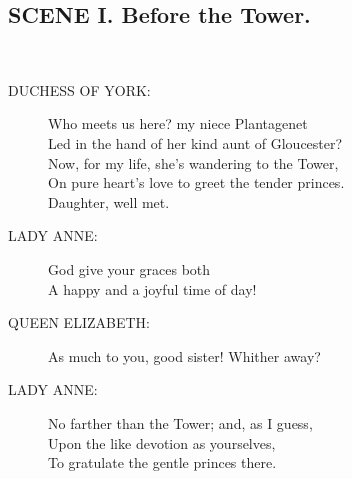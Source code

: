 \documentclass{article}
\begin{document}
\subsection*{SCENE I.  Before the Tower.}
\\
\begin{description}
\item[DUCHESS OF YORK:] 
\hspace{1pt}Who meets us here?  my niece Plantagenet\\
\hspace{1pt}Led in the hand of her kind aunt of Gloucester?\\
\hspace{1pt}Now, for my life, she's wandering to the Tower,\\
\hspace{1pt}On pure heart's love to greet the tender princes.\\
\hspace{1pt}Daughter, well met.\\
\end{description}
\begin{description}
\item[LADY ANNE:] 
\hspace{1pt}God give your graces both\\
\hspace{1pt}A happy and a joyful time of day!\\
\end{description}
\begin{description}
\item[QUEEN ELIZABETH:] 
\hspace{1pt}As much to you, good sister! Whither away?\\
\end{description}
\begin{description}
\item[LADY ANNE:] 
\hspace{1pt}No farther than the Tower; and, as I guess,\\
\hspace{1pt}Upon the like devotion as yourselves,\\
\hspace{1pt}To gratulate the gentle princes there.\\
\end{description}
\end{document}
